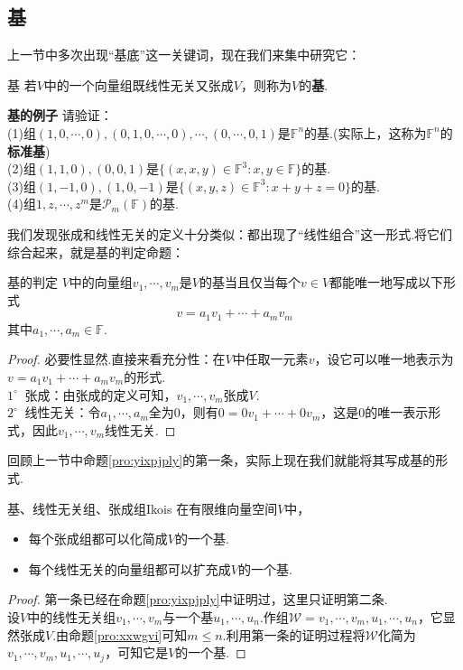 \documentclass[lang=cn, zihao=5]{elegantbook}
\newcommand{\F}{\mathbb{F}}
\newcommand{\buzhou}[1]{$#1^{\circ} \ $}
\newcommand{\examplefont}[1]{\color{mgreen} \textbf{#1}}
\begin{document}
\subsection{基}

上一节中多次出现“基底”这一关键词，现在我们来集中研究它：

\begin{definition}{基}
	若$V$中的一个向量组既线性无关又张成$V$，则称为$V$的\textbf{基}.
\end{definition}

\begin{example}{\examplefont{基的例子}}
	请验证： \\
	(1)组$(1,0,\cdots ,0),(0,1,0,\cdots ,0), \cdots ,(0,\cdots ,0,1)$是$\F ^{n}$的基.(实际上，这称为$\F ^{n}$的\textbf{标准基}) \\
	(2)组$(1,1,0),(0,0,1)$是$\{ (x,x,y) \in \F ^{3}:x,y \in \F \}$的基. \\
	(3)组$(1,-1,0),(1,0,-1)$是$\{ (x,y,z) \in \F ^{3}:x+y+z=0 \}$的基. \\
	(4)组$1,z, \cdots ,z^{m}$是$\mathcal{P}_m (\F)$的基.
\end{example}

我们发现张成和线性无关的定义十分类似：都出现了“线性组合”这一形式.将它们综合起来，就是基的判定命题：

\begin{proposition}{基的判定}
	$V$中的向量组$v_1, \cdots ,v_m$是$V$的基当且仅当每个$v \in V$都能唯一地写成以下形式$$v = a_1v_1 + \cdots + a_mv_m$$
	其中$a_1, \cdots ,a_m \in \F$.
\end{proposition}
\begin{proof}
	必要性显然.直接来看充分性：在$V$中任取一元素$v$，设它可以唯一地表示为$v = a_1v_1 + \cdots + a_mv_m$的形式. \\
	\buzhou{1} 张成：由张成的定义可知，$v_1, \cdots ,v_m$张成$V$. \\
	\buzhou{2} 线性无关：令$a_1, \cdots , a_m$全为$0$，则有$0=0v_1 + \cdots + 0v_m$，这是$0$的唯一表示形式，因此$v_1, \cdots ,v_m$线性无关.
\end{proof}

回顾上一节中命题\ref{pro:yixpjply}的第一条，实际上现在我们就能将其写成基的形式.

\begin{proposition}{基、线性无关组、张成组I}{kois}
	在有限维向量空间$V$中，
	\begin{itemize}
		\item 每个张成组都可以化简成$V$的一个基.
		\item 每个线性无关的向量组都可以扩充成$V$的一个基.
	\end{itemize}
\end{proposition}
\begin{proof}
	第一条已经在命题\ref{pro:yixpjply}中证明过，这里只证明第二条. \\
	设$V$中的线性无关组$v_1, \cdots ,v_m$与一个基$u_1, \cdots ,u_n$.作组$\mathcal{W} = v_1, \cdots ,v_m,u_1, \cdots ,u_n$，它显然张成$V$.由命题\ref{pro:xxwgvi}可知$m \leq n$.利用第一条的证明过程将$\mathcal{W}$化简为$v_1, \cdots , v_m , u_1, \cdots ,u_j$，可知它是$V$的一个基.
\end{proof}
\end{document}
